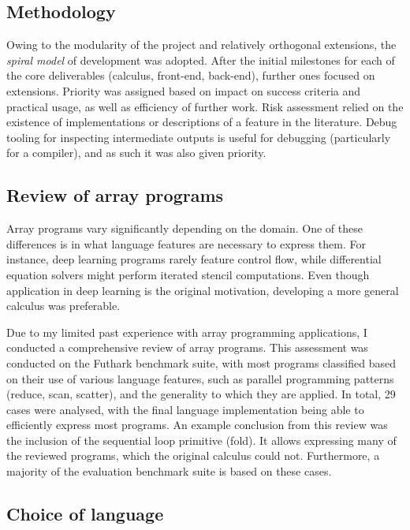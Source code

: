 \subsection{Methodology}

Owing to the modularity of the project and relatively orthogonal extensions, the \textit{spiral model} of development was adopted. After the initial milestones for each of the core deliverables (calculus, front-end, back-end), further ones focused on extensions. Priority was assigned based on impact on success criteria and practical usage, as well as efficiency of further work. Risk assessment relied on the existence of implementations or descriptions of a feature in the literature. Debug tooling for inspecting intermediate outputs is useful for debugging (particularly for a compiler), and as such it was also given priority.

\subsection{Review of array programs}

Array programs vary significantly depending on the domain. One of these differences is in what language features are necessary to express them. For instance, deep learning programs rarely feature control flow, while differential equation solvers might perform iterated stencil computations. Even though application in deep learning is the original motivation, developing a more general calculus was preferable.

Due to my limited past experience with array programming applications, I conducted a comprehensive review of array programs. This assessment was conducted on the Futhark benchmark suite, with most programs classified based on their use of various language features, such as parallel programming patterns (reduce, scan, scatter), and the generality to which they are applied. In total, 29 cases were analysed, with the final language implementation being able to efficiently express most programs.
An example conclusion from this review was the inclusion of the sequential loop primitive (fold). It allows expressing many of the reviewed programs, which the original calculus could not. 
Furthermore, a majority of the evaluation benchmark suite is based on these cases. 

\subsection{Choice of language}

